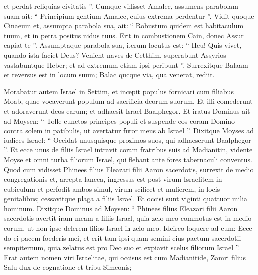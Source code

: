 \begin{biblechapter}
\begin{biblechapter}
\begin{biblechapter}
\begin{biblechapter}
\begin{biblechapter}
\begin{biblechapter}
\begin{biblechapter}
\begin{biblechapter}
\begin{biblechapter}
\begin{biblechapter}
\begin{biblechapter}
\begin{biblechapter}
\begin{biblechapter}
\begin{biblechapter}
\begin{biblechapter}
\begin{biblechapter}
\begin{biblechapter}
\begin{biblechapter}
\begin{biblechapter}
\begin{biblechapter}
\begin{biblechapter}
\begin{biblechapter}
\begin{biblechapter}
\begin{biblechapter}
 et perdat reliquias civitatis ”.
 \verse Cumque vidisset Amalec, assumens parabolam suam ait:
 “ Principium gentium Amalec,
 cuius extrema perdentur ”.
 \verse Vidit quoque Cinaeum et, assumpta parabola sua, ait:
 “ Robustum quidem est habitaculum tuum,
 et in petra positus nidus tuus.
 \verse Erit in combustionem Cain,
 donec Assur capiat te ”.
 \verse Assumptaque parabola sua, iterum locutus est:
 “ Heu! Quis vivet,
 quando ista faciet Deus?
 \verse Venient naves de Cetthim,
 superabunt Assyrios vastabuntque Heber;
 et ad extremum etiam ipsi peribunt ”.
 Surrexitque Balaam et reversus est in locum suum; Balac quoque via, qua venerat, rediit.
 
\begin{biblechapter}
\verse Morabatur autem Israel in Settim, et incepit populus fornicari cum filiabus Moab, 
\verse quae vocaverunt populum ad sacrificia deorum suorum. Et illi comederunt et adoraverunt deos earum; 
\verse et adhaesit Israel Baalphegor. Et iratus Dominus 
\verse ait ad Moysen: “ Tolle cunctos principes populi et suspende eos coram Domino contra solem in patibulis, ut avertatur furor meus ab Israel ”. 
\verse Dixitque Moyses ad iudices Israel: “ Occidat unusquisque proximos suos, qui adhaeserunt Baalphegor ”.
 \verse Et ecce unus de filiis Israel intravit coram fratribus suis ad Madianitin, vidente Moyse et omni turba filiorum Israel, qui flebant ante fores tabernaculi conventus. 
\verse Quod cum vidisset Phinees filius Eleazari filii Aaron sacerdotis, surrexit de medio congregationis et, arrepta lancea, 
\verse ingressus est post virum Israelitem in cubiculum et perfodit ambos simul, virum scilicet et mulierem, in locis genitalibus; cessavitque plaga a filiis Israel. 
\verse Et occisi sunt viginti quattuor milia hominum.
 \verse Dixitque Dominus ad Moysen: 
\verse “ Phinees filius Eleazari filii Aaron sacerdotis avertit iram meam a filiis Israel, quia zelo meo commotus est in medio eorum, ut non ipse delerem filios Israel in zelo meo. 
\verse Idcirco loquere ad eum: Ecce do ei pacem foederis mei, 
\verse et erit tam ipsi quam semini eius pactum sacerdotii sempiternum, quia zelatus est pro Deo suo et expiavit scelus filiorum Israel ”.
 \verse Erat autem nomen viri Israelitae, qui occisus est cum Madianitide, Zamri filius Salu dux de cognatione et tribu Simeonis; 

\end{biblechapter}
\end{biblechapter}
\end{biblechapter}
\end{biblechapter}
\end{biblechapter}
\end{biblechapter}
\end{biblechapter}
\end{biblechapter}
\end{biblechapter}
\end{biblechapter}
\end{biblechapter}
\end{biblechapter}
\end{biblechapter}
\end{biblechapter}
\end{biblechapter}
\end{biblechapter}
\end{biblechapter}
\end{biblechapter}
\end{biblechapter}
\end{biblechapter}
\end{biblechapter}
\end{biblechapter}
\end{biblechapter}
\end{biblechapter}
\end{biblechapter}

